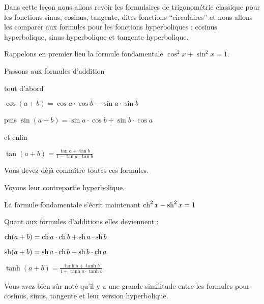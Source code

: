 







\debuttexte

\diapo


Dans cette leçon nous allons revoir les formulaires de trigonométrie classique
pour les fonctions sinus, cosinus, tangente, dites fonctions ``circulaires'' et nous allons 
les comparer aux formules pour les fonctions hyperboliques : cosinus hyperbolique, sinus hyperbolique
et tangente hyperbolique.

\change

Rappelons en premier lieu la formule fondamentale 
$\cos^2 x + \sin^2 x = 1$.


\change

Passons aux formules d'addition

tout d'abord 

$\cos(a+b)=\cos a\cdot\cos b - \sin a\cdot\sin b$

\change

puis 
$\sin(a+b)=\sin a\cdot\cos b  +  \sin b\cdot\cos a$

et enfin 

$\tan (a+b)=\frac{\tan a + \tan b}{1-\tan a\cdot\tan b}$

Vous devez déjà connaître toutes ces formules.


\change

Voyons leur contrepartie hyperbolique.


La formule fondamentale s'écrit maintenant
$\mathop{\mathrm{ch}}\nolimits^2 x - \mathop{\mathrm{sh}}\nolimits^2 x = 1$

\change

Quant aux formules d'additions elles deviennent :

$\mathop{\mathrm{ch}}\nolimits(a+b)=\mathop{\mathrm{ch}}\nolimits a\cdot\mathop{\mathrm{ch}}\nolimits b + \mathop{\mathrm{sh}}\nolimits a\cdot\mathop{\mathrm{sh}}\nolimits b$

\change

$\mathop{\mathrm{sh}}\nolimits(a+b)=\mathop{\mathrm{sh}}\nolimits a\cdot\mathop{\mathrm{ch}}\nolimits b  +  \mathop{\mathrm{sh}}\nolimits b\cdot\mathop{\mathrm{ch}}\nolimits a$

\change

$\tanh (a+b)=\frac{\tanh a + \tanh b}{1+\tanh a\cdot\tanh b}$



\diapo

Vous avez bien sûr noté qu'il y a une grande similitude entre les formules pour
cosinus, sinus, tangente et leur version hyperbolique.

